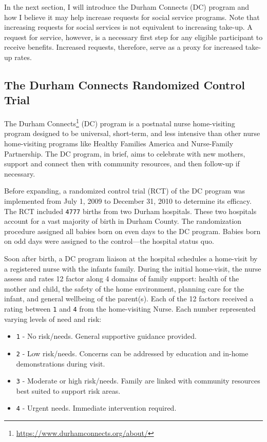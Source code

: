\documentclass[12pt,letterpaperpaper,]{book}
\providecommand{\tightlist}{%
  \setlength{\itemsep}{0pt}\setlength{\parskip}{0pt}}
\renewcommand{\href}[2]{#2\footnote{\url{#1}}}
\begin{document}
In the next section, I will introduce the Durham Connects (DC) program
and how I believe it may help increase requests for social service
programs. Note that increasing requests for social services is not
equivalent to increasing take-up. A request for service, however, is a
necessary first step for any eligible participant to receive benefits.
Increased requests, therefore, serve as a proxy for increased take-up
rates.

\subsection*{The Durham Connects Randomized Control
Trial}\label{the-durham-connects-randomized-control-trial}

The \href{https://www.durhamconnects.org/about/}{Durham Connects} (DC)
program is a postnatal nurse home-visiting program designed to be
universal, short-term, and less intensive than other nurse home-visiting
programs like Healthy Families America and Nurse-Family Partnership. The
DC program, in brief, aims to celebrate with new mothers, support and
connect then with community resources, and then follow-up if necessary.

Before expanding, a randomized control trial (RCT) of the DC program was
implemented from July 1, 2009 to December 31, 2010 to determine its
efficacy. The RCT included \texttt{4777} births from two Durham
hospitals. These two hospitals account for a vast majority of birth in
Durham County. The randomization procedure assigned all babies born on
even days to the DC program. Babies born on odd days were assigned to
the control---the hospital status quo.

Soon after birth, a DC program liaison at the hospital schedules a
home-visit by a registered nurse with the infants family. During the
initial home-visit, the nurse assess and rates 12 factor along 4 domains
of family support: health of the mother and child, the safety of the
home environment, planning care for the infant, and general wellbeing of
the parent(s). Each of the 12 factors received a rating between
\texttt{1} and \texttt{4} from the home-visiting Nurse. Each number
represented varying levels of need and risk:

\begin{itemize}
\tightlist
\item
  \texttt{1} - No risk/needs. General supportive guidance provided.
\item
  \texttt{2} - Low risk/needs. Concerns can be addressed by education
  and in-home demonstrations during visit.
\item
  \texttt{3} - Moderate or high risk/needs. Family are linked with
  community resources best suited to support risk areas.
\item
  \texttt{4} - Urgent needs. Immediate intervention required.
\end{itemize}
\end{document}
